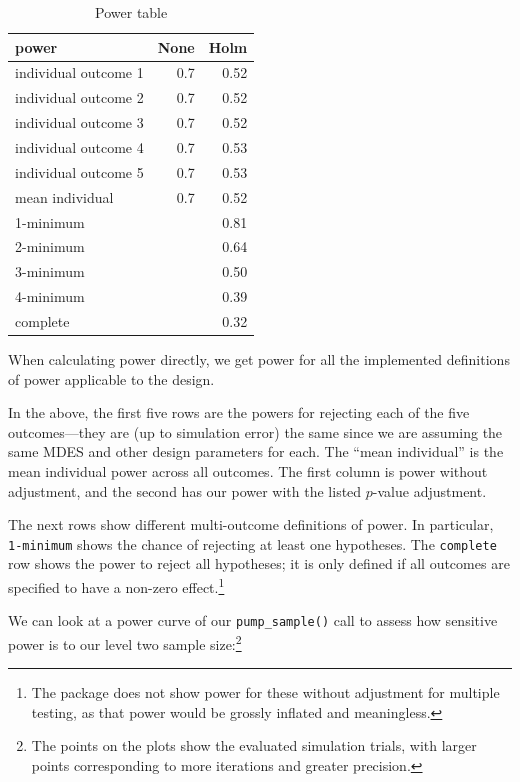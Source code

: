 \documentclass[
]{article}
\begin{document}
\begin{table}[h!]

\caption{\label{tab:unnamed-chunk-7}Power table}
\centering
\begin{tabular}[t]{lrr}
\toprule
power & None & Holm\\
\midrule
individual outcome 1 & 0.7 & 0.52\\
individual outcome 2 & 0.7 & 0.52\\
individual outcome 3 & 0.7 & 0.52\\
individual outcome 4 & 0.7 & 0.53\\
individual outcome 5 & 0.7 & 0.53\\
\addlinespace
mean individual & 0.7 & 0.52\\
1-minimum &  & 0.81\\
2-minimum &  & 0.64\\
3-minimum &  & 0.50\\
4-minimum &  & 0.39\\
\addlinespace
complete &  & 0.32\\
\bottomrule
\end{tabular}
\end{table}

When calculating power directly, we get power for all the implemented
definitions of power applicable to the design.

In the above, the first five rows are the powers for rejecting each of
the five outcomes---they are (up to simulation error) the same since we
are assuming the same MDES and other design parameters for each. The
``mean individual'' is the mean individual power across all outcomes.
The first column is power without adjustment, and the second has our
power with the listed \(p\)-value adjustment.

The next rows show different multi-outcome definitions of power. In
particular, \texttt{1-minimum} shows the chance of rejecting at least
one hypotheses. The \texttt{complete} row shows the power to reject all
hypotheses; it is only defined if all outcomes are specified to have a
non-zero effect.\footnote{The package does not show power for these
  without adjustment for multiple testing, as that power would be
  grossly inflated and meaningless.}

We can look at a power curve of our \texttt{pump\_sample()} call to
assess how sensitive power is to our level two sample size:\footnote{The
  points on the plots show the evaluated simulation trials, with larger
  points corresponding to more iterations and greater precision.}
\end{document}
